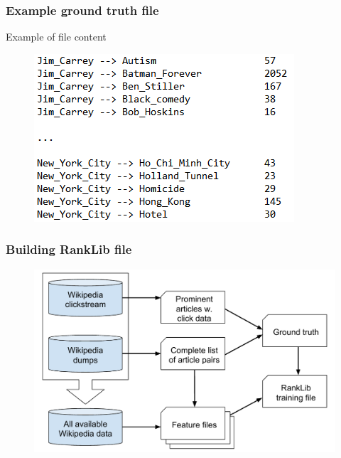 \begin{frame}
  \frametitle{Example ground truth file}
  
  \begin{exampleblock}{Example of file content}	
  \begin{figure}[tbph]
    \centering
    \includegraphics[width=0.7\linewidth]{images/GT_EXAMPLE}
  \end{figure}
  \end{exampleblock}

   
  
\end{frame}

\begin{frame}
  \frametitle{Building RankLib file}
  
      \begin{figure}[tbph]
    \centering
    \includegraphics[width=0.9\linewidth]{images/process_small}
  \end{figure}
  
\end{frame}

